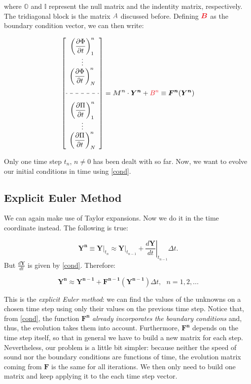 \documentclass{article}
\begin{document}
where $\mathbb{O}$ and $\mathbb{I}$ represent the null matrix and the indentity matrix, respectively. The tridiagonal block is the matrix $\textcolor{grayII}{A}$ discussed before. Defining $\textcolor{Red}{\bm{B}}$ as the boundary condition vector, we can then write:

\begin{equation}\label{cond}
\left[\begin{array}{c}
\displaystyle\left(\frac{\partial \Phi}{\partial t}\right)^n_1\\
\vdots\\
\displaystyle\left(\frac{\partial \Phi}{\partial t}\right)^n_N\\
\text{ }\\
\hdashline\\
\displaystyle\left(\frac{\partial \Pi}{\partial t}\right)^n_1\\
\vdots\\
\displaystyle\left(\frac{\partial \Pi}{\partial t}\right)^n_N
\end{array}\right]=\textcolor{grayII}{\bm{M^n}}\cdot \bm{Y^n}+\textcolor{Red}{B^n}\equiv \bm{F^n}(\bm{Y^n})
\end{equation}

Only one time step $t_n$, $n\neq0$ has been dealt with so far. Now, we want to evolve our initial conditions in time using \eqref{cond}.

\subsection{Explicit Euler Method}

We can again make use of Taylor expansions. Now we do it in the time coordinate instead. The following is true:

\begin{equation}\label{ttaylor}
\bm{Y^{n}}\equiv\left.\bm{Y}\right|_{t_n}\approx\left.\bm{Y}\right|_{t_{n-1}}+\left.\frac{d \bm{Y}}{d t}\right|_{t_{n-1}}\Delta t.
\end{equation}
But $\displaystyle\frac{d \bm{Y}}{d t}$ is given by \eqref{cond}. Therefore:

\begin{equation}\label{eeuler}
\boxed{\bm{Y^{n}}\approx\bm{Y^{n-1}}+\bm{F^{n-1}}(\bm{Y^{n-1}})\Delta t, \text{ }n=1,2,...}
\end{equation}

This is the \textit{explicit Euler method}: we can find the values of the unknowns on a chosen time step using only their values on the previous time step. Notice that, from \eqref{cond}, the function $\bm{F^n}$ \textit{already incorporates the boundary conditions} and, thus, the evolution takes them into account. Furthermore, $\bm{F^n}$ depends on the time step itself, so that in general we have to build a new matrix for each step. Nevertheless, our problem is a little bit simpler: because neither the speed of sound nor the boundary conditions are functions of time, the evolution matrix coming from $\bm{F}$ is the same for all iterations. We then only need to build one matrix and keep applying it to the each time step vector. 
\end{document}
